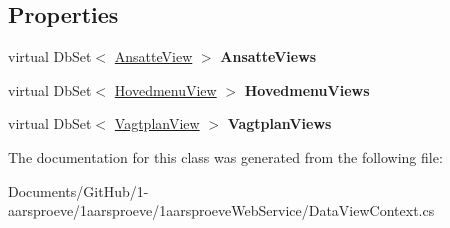 \subsection*{Properties}
\begin{DoxyCompactItemize}
\item 
\hypertarget{class__1aarsproeve_web_service_1_1_data_view_context_a2c5de3890f5858a2abed788720b45091}{}virtual Db\+Set$<$ \hyperlink{class__1aarsproeve_web_service_1_1_ansatte_view}{Ansatte\+View} $>$ {\bfseries Ansatte\+Views}\label{class__1aarsproeve_web_service_1_1_data_view_context_a2c5de3890f5858a2abed788720b45091}

\item 
\hypertarget{class__1aarsproeve_web_service_1_1_data_view_context_ac12b0249e2e6850381f2f3d2a2b1c4c0}{}virtual Db\+Set$<$ \hyperlink{class__1aarsproeve_web_service_1_1_hovedmenu_view}{Hovedmenu\+View} $>$ {\bfseries Hovedmenu\+Views}\label{class__1aarsproeve_web_service_1_1_data_view_context_ac12b0249e2e6850381f2f3d2a2b1c4c0}

\item 
\hypertarget{class__1aarsproeve_web_service_1_1_data_view_context_a412d532b848e4264ca37fcc13772c284}{}virtual Db\+Set$<$ \hyperlink{class__1aarsproeve_web_service_1_1_vagtplan_view}{Vagtplan\+View} $>$ {\bfseries Vagtplan\+Views}\label{class__1aarsproeve_web_service_1_1_data_view_context_a412d532b848e4264ca37fcc13772c284}

\end{DoxyCompactItemize}


The documentation for this class was generated from the following file\+:\begin{DoxyCompactItemize}
\item 
Documents/\+Git\+Hub/1-\/aarsproeve/1aarsproeve/1aarsproeve\+Web\+Service/Data\+View\+Context.\+cs\end{DoxyCompactItemize}
